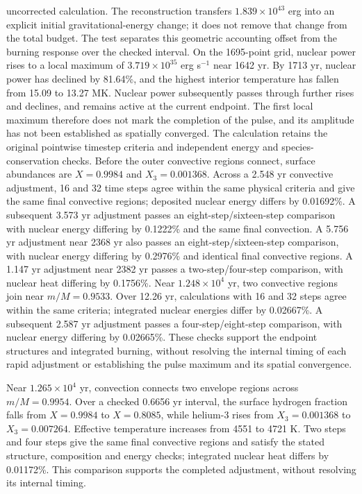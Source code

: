 \documentclass[11pt,letterpaper]{article}
\begin{document}
uncorrected calculation. The reconstruction transfers
$1.839\times10^{43}$ erg into an explicit initial gravitational-energy
change; it does not remove that change from the total budget.
The test separates this geometric accounting offset from the burning
response over the checked interval.
On the 1695-point grid, nuclear power rises to a local maximum of $3.719\times10^{35}$ erg s$^{-1}$
near 1642 yr. By 1713 yr, nuclear power has declined by 81.64\%, and the
highest interior temperature has fallen from 15.09 to 13.27 MK. Nuclear power
subsequently passes through further rises and declines, and remains active
at the current endpoint.
The first local maximum therefore does not mark the completion of the pulse,
and its amplitude has not been established as spatially converged.
The calculation retains the original pointwise timestep criteria and independent
energy and species-conservation checks. Before the outer convective regions
connect, surface abundances are $X=0.9984$ and $X_3=0.001368$.
Across a 2.548 yr convective adjustment, 16 and 32 time steps
agree within the same physical criteria and give the same final convective
regions; deposited nuclear energy differs by 0.01692\%. A subsequent
3.573 yr adjustment passes an eight-step/sixteen-step comparison with
nuclear energy differing by 0.1222\% and the same final convection.
A 5.756 yr adjustment near 2368 yr also passes an eight-step/sixteen-step
comparison, with nuclear energy differing by 0.2976\% and identical final
convective regions. A 1.147 yr adjustment near 2382 yr passes a two-step/four-step
comparison, with nuclear heat differing by 0.1756\%.
Near $1.248\times10^4$ yr, two convective regions join near $m/M=0.9533$.
Over 12.26 yr, calculations with 16 and 32 steps agree within the same
criteria; integrated nuclear energies differ by 0.02667\%. A subsequent
2.587 yr adjustment passes a four-step/eight-step comparison, with nuclear
energy differing by 0.02665\%. These checks support the
endpoint structures and integrated burning,
without resolving the internal timing of each rapid adjustment or
establishing the pulse maximum and its spatial convergence.

Near $1.265\times10^4$ yr, convection connects two envelope regions across
$m/M=0.9954$. Over a checked 0.6656 yr interval, the surface hydrogen
fraction falls from $X=0.9984$ to $X=0.8085$, while helium-3 rises from
$X_3=0.001368$ to $X_3=0.007264$. Effective temperature increases from
4551 to 4721 K. Two steps and four steps give the same final convective
regions and satisfy the stated structure, composition and energy checks;
integrated nuclear heat differs by 0.01172\%. This comparison supports
the completed adjustment, without resolving its internal timing.
\end{document}
